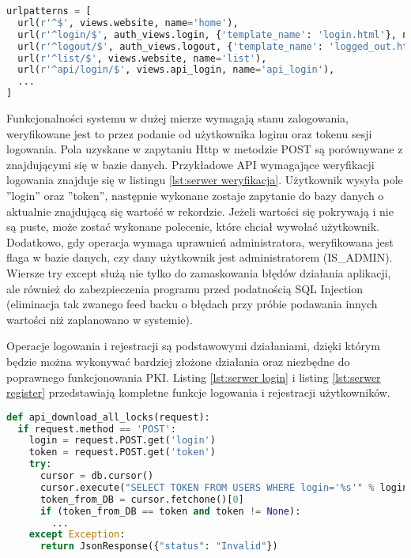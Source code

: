 {\footnotesize 
\begin{lstlisting}[caption={Fragment pliku urls.py}, label={lst:python url}, language=Python]
urlpatterns = [
  url(r'^$', views.website, name='home'),
  url(r'^login/$', auth_views.login, {'template_name': 'login.html'}, name='login'),
  url(r'^logout/$', auth_views.logout, {'template_name': 'logged_out.html'}, name='logout'),
  url(r'^list/$', views.website, name='list'),
  url(r'^api/login/$', views.api_login, name='api_login'),
  ...
]
\end{lstlisting}}

	Funkcjonalności systemu w  dużej mierze wymagają stanu zalogowania, weryfikowane jest to przez podanie od użytkownika loginu oraz tokenu sesji logowania. Pola uzyskane w zapytaniu Http w metodzie POST są porównywane z znajdującymi się w bazie danych. Przykładowe API wymagające weryfikacji logowania znajduje się w listingu \ref{lst:serwer weryfikacja}. Użytkownik wysyła pole ''login'' oraz ''token'', następnie wykonane zostaje zapytanie do bazy danych o aktualnie znajdującą się wartość w rekordzie. Jeżeli wartości się pokrywają i nie są puste, może zostać wykonane polecenie, które chciał wywołać użytkownik. Dodatkowo, gdy operacja wymaga uprawnień administratora, weryfikowana jest flaga w bazie danych, czy dany użytkownik jest administratorem (IS\_ADMIN). Wiersze try except służą nie tylko do zamaskowania błędów działania aplikacji, ale również do zabezpieczenia programu przed podatnością SQL Injection (eliminacja tak zwanego feed backu o błędach przy próbie podawania innych wartości niż zaplanowano w systemie).
	
	Operacje logowania i rejestracji są podstawowymi działaniami, dzięki którym będzie można wykonywać bardziej złożone działania oraz niezbędne do poprawnego funkcjonowania PKI. Listing \ref{lst:serwer login} i listing \ref{lst:serwer register} przedstawiają kompletne funkcje logowania i rejestracji użytkowników. 

	{\footnotesize 
	\begin{lstlisting}[caption={Przykładowe API weryfikujące stan logowania}, label={lst:serwer weryfikacja}, language=Python]
def api_download_all_locks(request):
  if request.method == 'POST':
    login = request.POST.get('login')
    token = request.POST.get('token')
    try:
      cursor = db.cursor()
      cursor.execute("SELECT TOKEN FROM USERS WHERE login='%s'" % login)
      token_from_DB = cursor.fetchone()[0]
      if (token_from_DB == token and token != None):
        ...
    except Exception:
      return JsonResponse({"status": "Invalid"})
	\end{lstlisting}}

